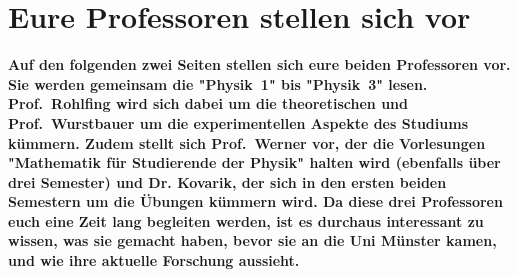 \section[Eure Profs stellen sich vor]{Eure Professoren stellen sich vor}
\textbf{Auf den folgenden zwei Seiten stellen sich eure beiden Professoren vor.
    Sie werden gemeinsam die "Physik~1" bis "Physik~3" lesen.
    Prof.\ Rohlfing wird sich dabei um die theoretischen und Prof.\ Wurstbauer um die experimentellen Aspekte des Studiums kümmern.
    Zudem stellt sich Prof.\ Werner vor, der die Vorlesungen "Mathematik für Studierende der Physik" halten wird (ebenfalls über drei Semester) und Dr. Kovarik, der sich in den ersten beiden Semestern um die Übungen kümmern wird.
	Da diese drei Professoren euch eine Zeit lang begleiten werden, ist es durchaus interessant zu wissen, was sie gemacht haben, bevor sie an die Uni Münster kamen, und wie ihre aktuelle Forschung aussieht.}

